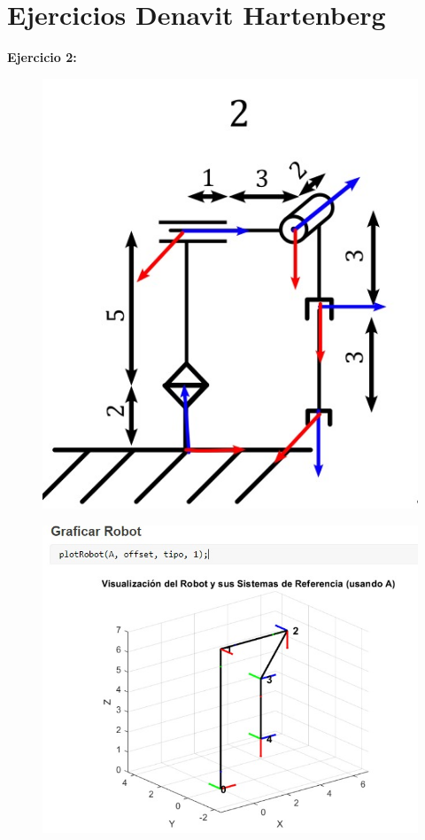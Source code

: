 \section{Ejercicios Denavit Hartenberg}
\vspace{10mm}
\textbf{Ejercicio 2:}
\vspace{5mm}

\begin{figure}
	\centering
	\includegraphics[width=0.7\linewidth]{img/2EJ}
	\caption{}
	\label{fig:2ej}
\end{figure}

\begin{figure}
	\centering
	\includegraphics[width=0.7\linewidth]{img/EJ2}
	\caption{}
	\label{fig:ej2}
\end{figure}
